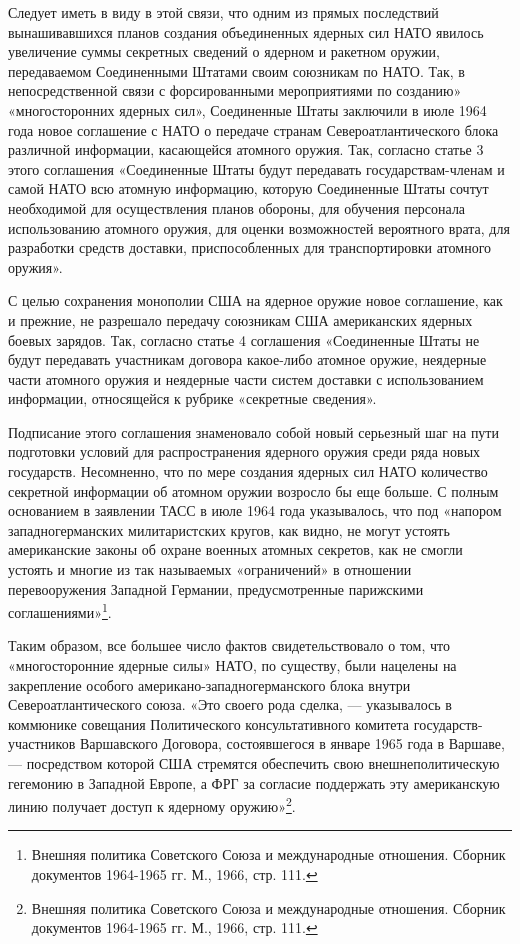 \documentclass[12pt, a4paper, openany]{book}
\begin{document}
	Следует иметь в виду в этой связи, что одним из прямых последствий вынашивавшихся планов создания объединенных ядерных сил НАТО явилось увеличение суммы секретных сведений о ядерном и ракетном оружии, передаваемом Соединенными Штатами своим союзникам по НАТО. Так, в непосредственной связи с форсированными мероприятиями по созданию» «многосторонних ядерных сил», Соединенные Штаты заключили в июле 1964 года новое соглашение с НАТО о передаче странам Североатлантического блока различной информации, касающейся атомного оружия. Так, согласно статье 3 этого соглашения «Соединенные Штаты будут передавать государствам-членам и самой НАТО всю атомную информацию, которую Соединенные Штаты сочтут необходимой для осуществления планов обороны, для обучения персонала использованию атомного оружия, для оценки возможностей вероятного врата, для разработки средств доставки, приспособленных для транспортировки атомного оружия».
	
	С целью сохранения монополии США на ядерное оружие новое соглашение, как и прежние, не разрешало передачу союзникам США американских ядерных боевых зарядов. Так, согласно статье 4 соглашения «Соединенные Штаты не будут передавать участникам договора какое-либо атомное оружие, неядерные части атомного оружия и неядерные части систем доставки с использованием информации, относящейся к рубрике «секретные сведения».
	
	Подписание этого соглашения знаменовало собой новый серьезный шаг на пути подготовки условий для распространения ядерного оружия среди ряда новых государств. Несомненно, что по мере создания ядерных сил НАТО количество секретной информации об атомном оружии возросло бы еще больше. С полным основанием в заявлении ТАСС в июле 1964 года указывалось, что под «напором западногерманских милитаристских кругов, как видно, не могут устоять американские законы об охране военных атомных секретов, как не смогли устоять и многие из так называемых «ограничений» в отношении перевооружения Западной Германии, предусмотренные парижскими соглашениями»{\footnote{Внешняя политика Советского Союза и международные отношения. Сборник документов 1964-1965 гг. М., 1966, стр. 111.}}.
	
	Таким образом, все большее число фактов свидетельствовало о том, что «многосторонние ядерные силы» НАТО, по существу, были нацелены на закрепление особого американо-западногерманского блока внутри Североатлантического союза. «Это своего рода сделка, — указывалось в коммюнике совещания Политического консультативного комитета государств-участников Варшавского Договора, состоявшегося в январе 1965 года в Варшаве, — посредством которой США стремятся обеспечить свою внешнеполитическую гегемонию в Западной Европе, а ФРГ за согласие поддержать эту американскую линию получает доступ к ядерному оружию»{\footnote{Внешняя политика Советского Союза и международные отношения. Сборник документов 1964-1965 гг. М., 1966, стр. 111.}}.
	
\end{document}
